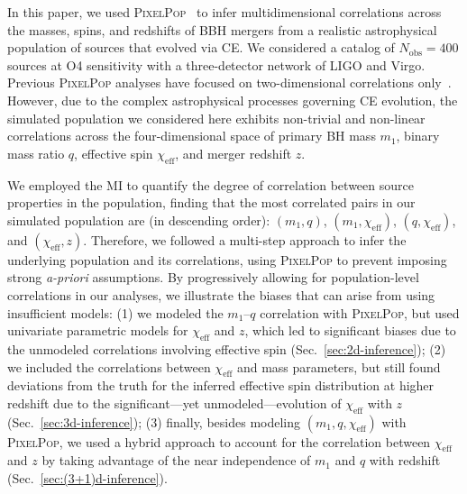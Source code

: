 \documentclass[twocolumn, twocolappendix]{aastex631}
\newcommand{\chieff}{\ensuremath{\chi_\mathrm{eff}}}
\newcommand{\PixelPop}{\textsc{PixelPop}\xspace}
\begin{document}
In this paper, we used \PixelPop~\citep{Heinzel:2024jlc, Heinzel:2024hva} to infer multidimensional correlations across the masses, spins, and redshifts of \ac{BBH} mergers from a
realistic astrophysical population of sources that evolved via \ac{CE}. We considered a catalog of $N_\mathrm{obs}=400$ sources at \ac{O4} sensitivity with a three-detector network of LIGO and Virgo. Previous \PixelPop analyses have focused on two-dimensional correlations only~\citep{Heinzel:2024hva,Heinzel:2024jlc}. However, due to the complex astrophysical processes governing \ac{CE} evolution, the simulated population we considered here exhibits non-trivial and non-linear correlations across the four-dimensional space of primary \ac{BH} mass $m_1$, binary mass ratio $q$, effective spin $\chi_\mathrm{eff}$, and merger redshift $z$.

We employed the \acf{MI} to quantify the degree of correlation between source properties in the population, finding that the most correlated pairs in our simulated population are (in descending order): $(m_1,q)$, $(m_1,\chieff)$, $(q,\chieff)$, and $(\chieff,z)$.
Therefore, we followed a multi-step approach to infer the underlying population and its correlations, using \PixelPop to prevent imposing strong \textit{a-priori} assumptions. By progressively allowing for population-level correlations in our analyses, we illustrate the biases that can arise from using insufficient models: (1) we modeled the $m_1$--$q$ correlation with \PixelPop, but used univariate parametric models for $\chi_\mathrm{eff}$ and $z$, which led to significant biases due to the unmodeled correlations involving effective spin (Sec.~\ref{sec:2d-inference}); (2) we included the correlations between $\chieff$ and mass parameters, but still found deviations from the truth for the inferred effective spin distribution at higher redshift due to the significant---yet unmodeled---evolution of $\chieff$ with $z$ (Sec.~\ref{sec:3d-inference}); (3) finally, besides modeling $(m_1,q,\chieff)$ with \PixelPop, we used a hybrid approach to account for the correlation between $\chi_\mathrm{eff}$ and $z$ by taking advantage of the near independence of $m_1$ and $q$ with redshift (Sec.~\ref{sec:(3+1)d-inference}). 
\end{document}
